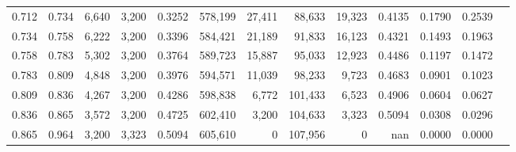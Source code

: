\begin{tabular}{rrrrrrrrrrrrr}
0.712 & 0.734 &  6,640 & 3,200 &                                     0.3252 & 578,199 &  27,411 &  88,633 &  19,323 & 0.4135 & 0.1790 & 0.2539 \\
0.734 & 0.758 &  6,222 & 3,200 &                                     0.3396 & 584,421 &  21,189 &  91,833 &  16,123 & 0.4321 & 0.1493 & 0.1963 \\
0.758 & 0.783 &  5,302 & 3,200 &                                     0.3764 & 589,723 &  15,887 &  95,033 &  12,923 & 0.4486 & 0.1197 & 0.1472 \\
0.783 & 0.809 &  4,848 & 3,200 &                                     0.3976 & 594,571 &  11,039 &  98,233 &   9,723 & 0.4683 & 0.0901 & 0.1023 \\
0.809 & 0.836 &  4,267 & 3,200 &                                     0.4286 & 598,838 &   6,772 & 101,433 &   6,523 & 0.4906 & 0.0604 & 0.0627 \\
0.836 & 0.865 &  3,572 & 3,200 &                                     0.4725 & 602,410 &   3,200 & 104,633 &   3,323 & 0.5094 & 0.0308 & 0.0296 \\
0.865 & 0.964 &  3,200 & 3,323 &                                     0.5094 & 605,610 &       0 & 107,956 &       0 &    nan & 0.0000 & 0.0000 \\
\bottomrule
\end{tabular}
